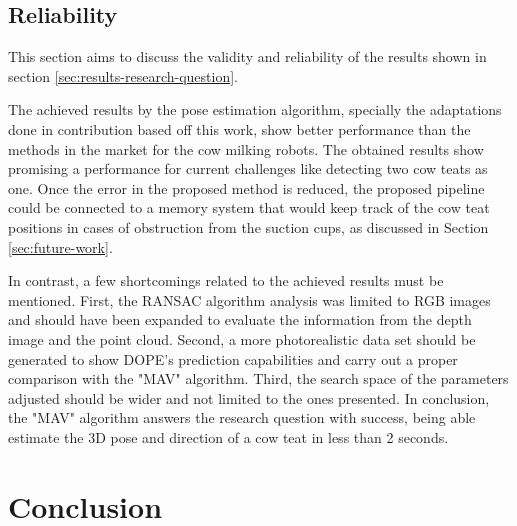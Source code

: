 \section{Reliability}\label{sec:results-reliability}
This section aims to discuss the validity and reliability of the results shown in section \ref{sec:results-research-question}.

The achieved results by the pose estimation algorithm, specially the adaptations done in contribution based off this work, show better performance than the methods in the market for the cow milking robots. The obtained results show promising a performance for current challenges like detecting two cow teats as one. Once the error in the proposed method is reduced, the proposed pipeline could be connected to a memory system that would keep track of the cow teat positions in cases of obstruction from the suction cups, as discussed in Section \ref{sec:future-work}.

In contrast, a few shortcomings related to the achieved results must be mentioned. First, the RANSAC algorithm analysis was limited to RGB images and should have been expanded to evaluate the information from the depth image and the point cloud. Second, a more photorealistic data set should be generated to show DOPE's prediction capabilities and carry out a proper comparison with the "MAV" algorithm. Third, the search space of the parameters adjusted should be wider and not limited to the ones presented. In conclusion, the "MAV" algorithm answers the research question with success, being able estimate the 3D pose and direction of a cow teat in less than 2 seconds.

\chapter{Conclusion}\label{chap:conclusion}
